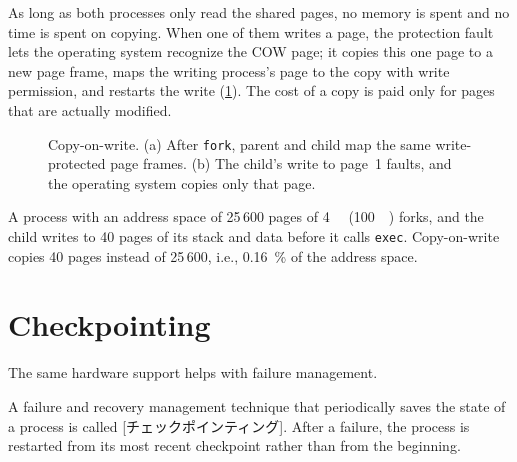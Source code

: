 \documentclass[../main.tex]{subfiles}
\begin{document}
As long as both processes only read the shared pages, no memory is spent
and no time is spent on copying.  When one of them writes a page, the
protection fault lets the operating system recognize the COW page; it
copies this one page to a new page frame, maps the writing process's page
to the copy with write permission, and restarts the write
(\cref{fig:l08-cow}).  The cost of a copy is paid only for pages that are
actually modified.

\begin{figure}[htbp]
  \centering
  
  \caption{Copy-on-write.  (a) After \texttt{fork}, parent and child map the
    same write-protected page frames.  (b) The child's write to page~1
    faults, and the operating system copies only that page.}
  \label{fig:l08-cow}
\end{figure}

\begin{example}
  A process with an address space of 25\,600 pages of \SI{4}{\kibi\byte}
  (\SI{100}{\mebi\byte}) forks, and the child writes to 40 pages of its
  stack and data before it calls \texttt{exec}.  Copy-on-write copies
  40 pages instead of 25\,600, i.e., \SI{0.16}{\percent} of the address
  space.
\end{example}

\section{Checkpointing}
\label{sec:l08-checkpointing}

The same hardware support helps with failure
management.

\begin{definition}[Checkpointing]
  A failure and recovery management technique that periodically saves the
  state of a process is called [チェックポインティング].
  After a failure, the process is restarted from its most recent checkpoint
  rather than from the beginning.
\end{definition}
\end{document}
